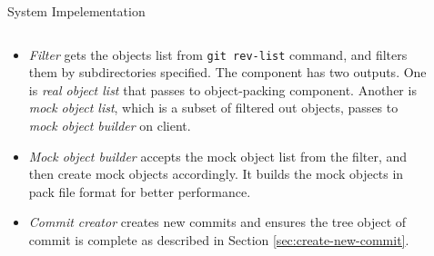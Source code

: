 \documentclass[final]{beamer}
\begin{document}
\begin{frame}[t]
\begin{columns}[t]
\begin{column}{.5\linewidth}
\begin{block}{System Impelementation}
\begin{columns}[T]
\begin{column}{.3\textwidth}
\begin{itemize}
  \item \emph{Filter} gets the objects list from
    \verb|git rev-list| command, and filters them by subdirectories specified.
    The component has two outputs.
    One is \emph{real object list} that passes to object-packing component.
    Another is \emph{mock object list}, which is a subset of filtered out
    objects, passes to \emph{mock object builder} on client.

  \item \emph{Mock object builder} accepts the mock object list
    from the filter, and then create mock objects accordingly.
    It builds the mock objects in pack file format\cite{packformat} for better
    performance.

  \item \emph{Commit creator} creates new commits and ensures
    the tree object of commit is complete as described in Section
    \ref{sec:create-new-commit}.
\end{itemize}
          \end{column}
          \begin{column}{.7\textwidth}
              \begin{figure} \centering
              \end{figure}
          \end{column}
        \end{columns}
      \end{block}
    \end{column}
  \end{columns}
\end{frame}
\end{document}
